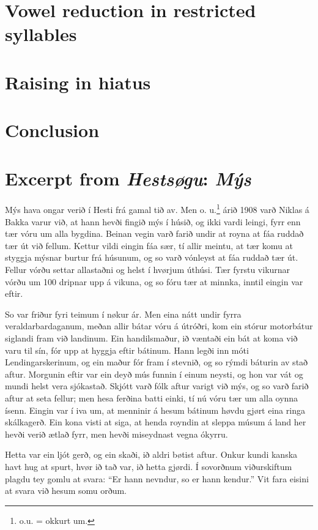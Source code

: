 \documentclass[a4paper]{article}
\begin{document}
\section{Vowel reduction in restricted syllables}

\section{Raising in hiatus}

\section{Conclusion}

\appendix
\section{Excerpt from \textit{Hestsøgu}: \textit{Mýs} \parencite[177]{lockwood:02}}\label{app:readingtext}

Mýs hava ongar verið í Hesti frá gamal tið av. Men o. u.\footnote{o.u. = okkurt um.} árið 1908 varð Niklas á Bakka varur við, at hann hevði fingið mýs í húsið, og ikki vardi leingi, fyrr enn tær vóru um alla bygdina. Beinan vegin varð farið undir at royna at fáa ruddað tær út við fellum. Kettur vildi eingin fáa sær, tí allir meintu, at tær komu at styggja mýsnar burtur frá húsunum, og so varð vónleyst at fáa ruddað tær út. Fellur vórðu settar allastaðni og helst í hvørjum úthúsi. Tær fyrstu vikurnar vórðu um 100 dripnar upp á vikuna, og so fóru tær at minnka, inntil eingin var eftir.

So var friður fyri teimum í nøkur ár. Men eina nátt undir fyrra veraldarbardaganum, meðan allir bátar vóru á útróðri, kom ein stórur motorbátur siglandi fram við landinum. Ein handilsmaður, ið væntaði ein bát at koma við varu til sín, fór upp at hyggja eftir bátinum. Hann legði inn móti Lendingarskerinum, og ein maður fór fram í stevnið, og so rýmdi báturin av stað aftur. Morgunin eftir var ein deyð mús funnin í einum neysti, og hon var vát og mundi helst vera sjókastað. Skjótt varð fólk aftur varigt við mýs, og so varð farið aftur at seta fellur; men hesa ferðina batti einki, tí nú vóru tær um alla oynna ísenn. Eingin var í iva um, at menninir á hesum bátinum høvdu gjørt eina ringa skálkagerð. Ein kona visti at siga, at henda royndin at sleppa músum á land her hevði verið ætlað fyrr, men hevði miseydnast vegna ókyrru.

Hetta var ein ljót gerð, og ein skaði, ið aldri bøtist aftur. Onkur kundi kanska havt hug at spurt, hvør ið tað var, ið hetta gjørdi. Í sovorðnum viðurskiftum plagdu tey gomlu at svara: ``Er hann nevndur, so er hann kendur.'' Vit fara eisini at svara við hesum somu orðum.

\nocite{*}

\printbibliography
\end{document}
